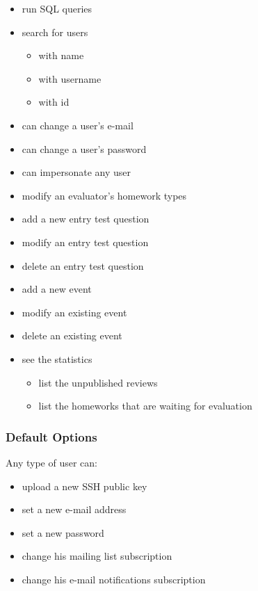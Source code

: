 \begin{itemize}
	\item run SQL queries
	\item search for users
	\begin{itemize}
		\item with name
		\item with username
		\item with id
	\end{itemize}
	\item can change a user's e-mail
	\item can change a user's password
	\item can impersonate any user
	\item modify an evaluator's homework types
	\item add a new entry test question
	\item modify an entry test question
	\item delete an entry test question
	\item add a new event
	\item modify an existing event
	\item delete an existing event
	\item see the statistics
	\begin{itemize}
		\item list the unpublished reviews
		\item list the homeworks that are waiting for evaluation
	\end{itemize}
\end{itemize}

\subsubsection{Default Options}

Any type of user can:

\begin{itemize}
	\item upload a new SSH public key
	\item set a new e-mail address
	\item set a new password
	\item change his mailing list subscription
	\item change his e-mail notifications subscription
\end{itemize}

